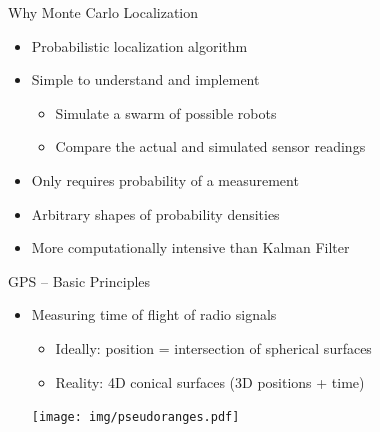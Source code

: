 \documentclass[utf8,12pt]{beamer}
\begin{document}
\begin{frame}{Why Monte Carlo Localization}
    \begin{itemize}
        \item Probabilistic localization algorithm
        \item Simple to understand and implement
        \begin{itemize}
            \item Simulate a swarm of possible robots
            \item Compare the actual and simulated sensor readings
        \end{itemize}
        \item Only requires probability of a measurement
        \item Arbitrary shapes of probability densities
    \end{itemize}

    \begin{itemize}
        \item More computationally intensive than Kalman Filter
    \end{itemize}
\end{frame}

\begin{frame}{GPS -- Basic Principles}
    \begin{itemize}
        \item Measuring time of flight of radio signals
        \begin{itemize}
            \item Ideally: position = intersection of spherical surfaces
            \item Reality: 4D conical surfaces (3D positions + time)
        \end{itemize}
    \vspace{0.5cm}
    \centerline{\texttt{[image: img/pseudoranges.pdf]}}
    \end{itemize}
\end{frame}
\end{document}
